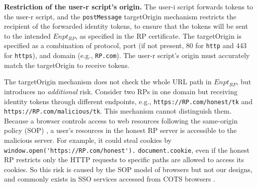 \noindent \textbf{Restriction of the user-r script's origin.}
The user-i script forwards tokens to the user-r script, and the \verb+postMessage+ targetOrigin mechanism \cite{postm-targeto} restricts the recipient of the forwarded identity tokens, to ensure that the tokens will be sent to the intended $Enpt_{RP}$, as specified in the RP certificate. The targetOrigin is specified as a combination of protocol, port (if not present, 80 for \verb+http+ and 443 for \verb+https+), and domain (e.g., \verb+RP.com+).
The user-r script's origin must accurately match the targetOrigin to receive tokens.

The targetOrigin mechanism does not check the whole URL path in $Enpt_{RP}$, but introduces no {\em additional} risk.
Consider two RPs in one domain but receiving identity tokens through different endpoints,
 e.g., \verb+https://RP.com/honest/tk+ and \verb+https://RP.com/malicious/tk+.
This mechanism cannot distinguish them.
%
%
Because a browser controls access to web resources following the same-origin policy (SOP) \cite{sop},
    a user's resources in the honest RP server is accessible to  the malicious server.
 For example, it could steal cookies by \verb+window.open('https://RP.com/honest').+ \verb+document.cookie+,
 even if the honest RP restricts only the HTTP requests to specific paths are allowed to access its cookies.
So this risk is caused by the SOP model of browsers but not our designs,
    and commonly exists in SSO services accessed from COTS browsers \cite{rfc6749,SPRESSO,MITREid,GoogleIdIntegrate,uber}.




